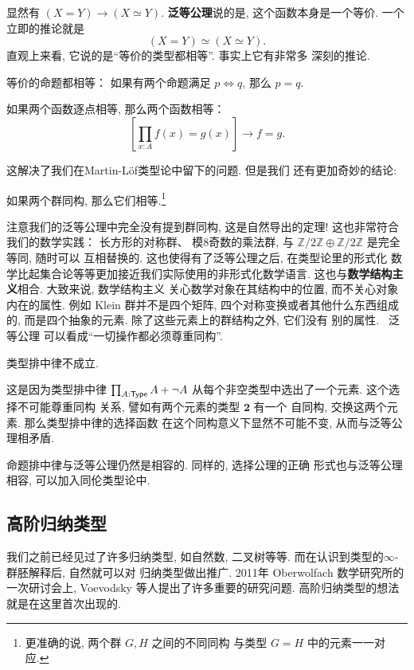 显然有 \((X = Y) \to (X \simeq Y)\).
\textbf{泛等公理}说的是, 这个函数本身是一个等价.
一个立即的推论就是
\[(X = Y) \simeq (X \simeq Y).\]
直观上来看, 它说的是“等价的类型都相等”. 事实上它有非常多
深刻的推论.
\begin{corollary}[命题外延]
等价的命题都相等： 如果有两个命题满足
\(p \iff q\), 那么 \(p = q\).
\end{corollary}
\begin{corollary}[函数外延]
如果两个函数逐点相等, 那么两个函数相等：
\[\left[\prod_{x:A} f(x) = g(x)\right] \to f = g.\]
\end{corollary}
这解决了我们在Martin-L\"of类型论中留下的问题. 但是我们
还有更加奇妙的结论:
\begin{corollary}
如果两个群同构, 那么它们相等.\footnote{更准确的说, 两个群 \(G, H\) 之间的不同同构
与类型 \(G = H\) 中的元素一一对应.}
\end{corollary}
注意我们的泛等公理中完全没有提到群同构, 这是自然导出的定理!
这也非常符合我们的数学实践： 长方形的对称群、 模8奇数的乘法群,
与 \(\mathbb Z/2\mathbb Z \oplus
\mathbb Z/2\mathbb Z\) 是完全等同, 随时可以
互相替换的. 这也使得有了泛等公理之后, 在类型论里的形式化
数学比起集合论等等更加接近我们实际使用的非形式化数学语言.
这也与\textbf{数学结构主义}相合. 大致来说, 数学结构主义
关心数学对象在其结构中的位置, 而不关心对象内在的属性. 例如
Klein 群并不是四个矩阵, 四个对称变换或者其他什么东西组成的,
而是四个抽象的元素. 除了这些元素上的群结构之外, 它们没有
别的属性.~\cite{awodey:2013:structuralism} 泛等公理
可以看成“一切操作都必须尊重同构”.
\begin{corollary}
类型排中律不成立.
\end{corollary}
这是因为类型排中律 \(\prod_{A:\textsf{Type}} A + \neg A\)
从每个非空类型中选出了一个元素. 这个选择不可能尊重同构
关系, 譬如有两个元素的类型 \(\boldsymbol 2\) 有一个
自同构, 交换这两个元素. 那么类型排中律的选择函数
在这个同构意义下显然不可能不变, 从而与泛等公理相矛盾.

命题排中律与泛等公理仍然是相容的. 同样的, 选择公理的正确
形式也与泛等公理相容, 可以加入同伦类型论中.

\subsection{高阶归纳类型}
我们之前已经见过了许多归纳类型, 如自然数, 二叉树等等.
而在认识到类型的\(\infty\)-群胚解释后, 自然就可以对
归纳类型做出推广. 2011年 Oberwolfach 数学研究所的
一次研讨会上, Voevodsky 等人提出了许多重要的研究问题.
高阶归纳类型的想法就是在这里首次出现的.

